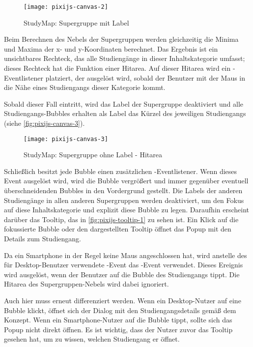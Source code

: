\begin{figure}[H]
    \centering
    \texttt{[image: pixijs-canvas-2]}
    \caption{StudyMap: Supergruppe mit Label}
    \label{fig:pixijs-canvas-2}
\end{figure}

Beim Berechnen des Nebels der Supergruppen werden gleichzeitig die Minima und Maxima der x- und y-Koordinaten berechnet. Das Ergebnis ist ein unsichtbares Rechteck, das alle Studiengänge in dieser Inhaltskategorie umfasst; dieses Rechteck hat die Funktion einer Hitarea. Auf dieser Hitarea wird ein -Eventlistener platziert, der ausgelöst wird, sobald der Benutzer mit der Maus in die Nähe eines Studiengangs dieser Kategorie kommt.

Sobald dieser Fall eintritt, wird das Label der Supergruppe deaktiviert und alle Studiengangs-Bubbles erhalten als Label das Kürzel des jeweiligen Studiengangs (siehe \autoref{fig:pixijs-canvas-3}).

\begin{figure}[H]
    \centering
    \texttt{[image: pixijs-canvas-3]}
    \caption{StudyMap: Supergruppe ohne Label - Hitarea}
    \label{fig:pixijs-canvas-3}
\end{figure}

Schließlich besitzt jede Bubble einen zusätzlichen -Eventlistener. Wenn dieses Event ausgelöst wird, wird die Bubble vergrößert und immer gegenüber eventuell überschneidenden Bubbles in den Vordergrund gestellt. Die Labels der anderen Studiengänge in allen anderen Supergruppen werden deaktiviert, um den Fokus auf diese Inhaltskategorie und explizit diese Bubble zu legen. Daraufhin erscheint darüber das Tooltip, das in \autoref{fig:pixijs-tooltip-1} zu sehen ist. Ein Klick auf die fokussierte Bubble oder den dargestellten Tooltip öffnet das Popup mit den Details zum Studiengang.

Da ein Smartphone in der Regel keine Maus angeschlossen hat, wird anstelle des für Desktop-Benutzer verwendete -Event das -Event verwendet. Dieses Ereignis wird ausgelöst, wenn der Benutzer auf die Bubble des Studiengangs tippt. Die Hitarea des Supergruppen-Nebels wird dabei ignoriert.

Auch hier muss erneut differenziert werden. Wenn ein Desktop-Nutzer auf eine Bubble klickt, öffnet sich der Dialog mit den Studiengangsdetails gemäß dem Konzept. Wenn ein Smartphone-Nutzer auf die Bubble tippt, sollte sich das Popup nicht direkt öffnen. Es ist wichtig, dass der Nutzer zuvor das Tooltip gesehen hat, um zu wissen, welchen Studiengang er öffnet.

